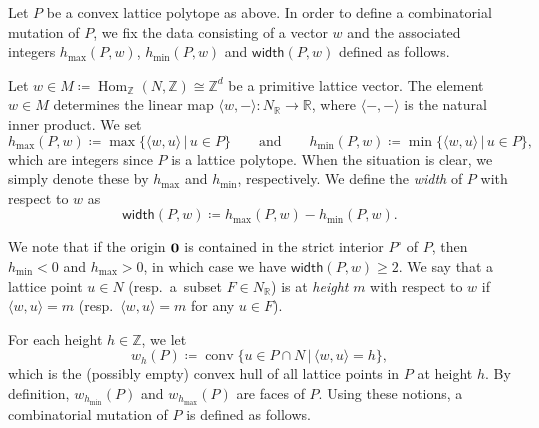 \documentclass[pdftex]{sigma}%
\numberwithin{equation}{section}
\numberwithin{figure}{section}
\numberwithin{table}{section}
\newcommand{\ZZ}{\mathbb{Z}}
\newcommand{\RR}{\mathbb{R}}
\newcommand{\Hom}{\operatorname{Hom}}
\newcommand{\width}{\mathsf{width}}
\begin{document}
\begin{Definition}\label{def_mutation_data}
Let $P$ be a convex lattice polytope as above.
In order to define a combinatorial mutation of $P$, we fix the data consisting of a vector $w$ and the associated integers $h_{\max}(P,w)$,
$h_{\min}(P,w)$ and $\width(P,w)$ defined as follows.

Let $w\in M\coloneqq\Hom_\ZZ(N,\ZZ)\cong\ZZ^d$ be a primitive lattice vector.
The element $w\in M$ determines the linear map $\langle w,-\rangle\colon N_\RR\rightarrow \RR$, where $\langle-,- \rangle$ is the natural inner product.
We set
\begin{displaymath}
h_{\max}(P,w)\coloneqq{\max}\{\langle w,u\rangle \,|\, u\in P\} \qquad\text{and}\qquad
h_{\min}(P,w)\coloneqq{\min}\{\langle w,u\rangle \,|\, u\in P\},
\end{displaymath}
which are integers since $P$ is a lattice polytope.
When the situation is clear, we simply denote these by $h_{\max}$ and $h_{\min}$, respectively.
We define the \emph{width} of $P$ with respect to $w$ as
\begin{displaymath}
\width(P,w)\coloneqq h_{\max}(P,w)-h_{\min}(P,w).
\end{displaymath}
\end{Definition}

We note that if the origin ${\bf 0}$ is contained in the strict interior $P^\circ$ of $P$, then $h_{\min}<0$ and $h_{\max}>0$, in which case we have $\width(P,w)\ge2$.
We say that a lattice point $u\in N$ (resp.\ a~subset $F\in N_\RR$) is at \emph{height} $m$ with respect to $w$ if $\langle w,u\rangle=m$
(resp.\ $\langle w,u\rangle=m$ for any $u\in F$).

For each height $h\in\ZZ$, we let
\begin{displaymath}
w_h(P)\coloneqq\operatorname{conv}\{u\in P\cap N \,|\, \langle w,u\rangle=h\},
\end{displaymath}
which is the (possibly empty) convex hull of all lattice points in $P$ at height $h$.
By definition, $w_{h_{\min}}(P)$ and $w_{h_{\max}}(P)$ are faces of $P$.
Using these notions, a combinatorial mutation of $P$ is defined as follows.
\end{document}
